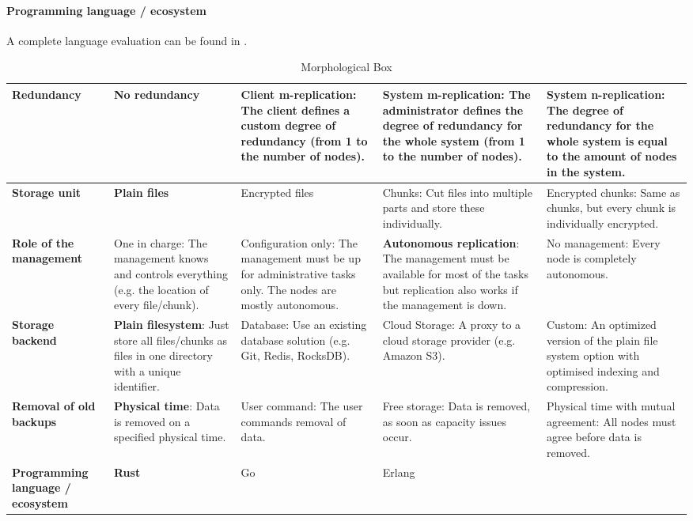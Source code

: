 \paragraph{Programming language / ecosystem}
A complete language evaluation can be found in .


\begin{table}
	\centering
	\caption[Morphological Box]{Morphological Box}
	\label{tbl:morphological-box}
    \begin{tabu}{X | X X X X}
		\hline
          \textbf{Redundancy}
          & No redundancy
          & Client m-replication: The client defines a custom degree of redundancy (from 1 to the number of nodes).
          & System m-replication: The administrator defines the degree of redundancy for the whole system (from 1 to the number of nodes).
          & \textbf{System n-replication}: The degree of redundancy for the whole system is equal to the amount of nodes in the system.
          \\ \hline

          \textbf{Storage unit}
          & \textbf{Plain files}
          & Encrypted files
          & Chunks: Cut files into multiple parts and store these individually.
          & Encrypted chunks: Same as chunks, but every chunk is individually encrypted.
          \\ \hline


          \textbf{Role of the management}
          & One in charge: The management knows and controls everything (e.g. the location of every file/chunk).
          & Configuration only: The management must be up for administrative tasks only. The nodes are mostly autonomous.
          & \textbf{Autonomous replication}: The management must be available for most of the tasks but replication also works if the management is down.
          & No management: Every node is completely autonomous.
          \\ \hline


          \textbf{Storage backend}
          & \textbf{Plain filesystem}: Just store all files/chunks as files in one directory with a unique identifier.
          & Database: Use an existing database solution (e.g. Git, Redis, RocksDB).
          & Cloud Storage: A proxy to a cloud storage provider (e.g. Amazon S3).
          & Custom: An optimized version of the plain file system option with optimised indexing and compression.
          \\ \hline


          \textbf{Removal of old backups}
          & \textbf{Physical time}: Data is removed on a specified physical time.
          & User command: The user commands removal of data.
          & Free storage: Data is removed, as soon as capacity issues occur.
          & Physical time with mutual agreement: All nodes must agree before data is removed.
          \\ \hline


          \textbf{Programming language / ecosystem}
          & \textbf{Rust}
          & Go
          & Erlang
          & 
          \\ \hline
	\end{tabu}
\end{table}
